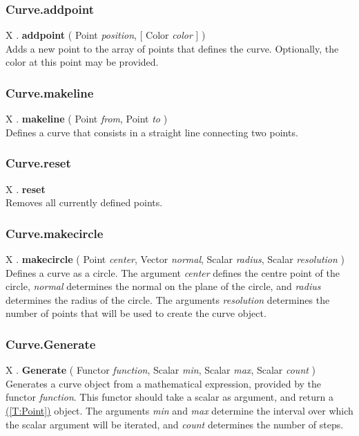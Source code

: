\documentclass[10pt]{book}
\newcommand{\linkitem}[1]{\hyperref[#1]{\nameref{#1} (\ref{#1})}}
\newcommand{\var}[1]{\textit{#1}}
\begin{document}
\subsubsection{Curve.addpoint \label{F:Curve:addpoint}}
X . \textbf{addpoint} ( Point \textit{position},  [ Color \textit{color} ] ) \\
Adds a new point to the array of points that defines the curve. Optionally, the color at this point may be provided.

\subsubsection{Curve.makeline \label{F:Curve:makeline}}
X . \textbf{makeline} ( Point \textit{from}, Point \textit{to} ) \\
Defines a curve that consists in a straight line connecting two points.

\subsubsection{Curve.reset \label{F:Curve:reset}}
X . \textbf{reset} \\
Removes all currently defined points.

\subsubsection{Curve.makecircle \label{F:Curve:makecircle}}
X . \textbf{makecircle} ( Point \textit{center}, Vector \textit{normal}, Scalar \textit{radius}, Scalar \textit{resolution} ) \\
Defines a curve as a circle. The argument \var{center} defines the centre point of the circle, \var{normal} determines the normal on the plane of the circle, and \var{radius} determines the radius of the circle. The arguments \var{resolution} determines the number of points that will be used to create the curve object.

\subsubsection{Curve.Generate \label{F:Curve:Generate}}
X . \textbf{Generate} ( Functor \textit{function}, Scalar \textit{min}, Scalar \textit{max}, Scalar \textit{count} ) \\
Generates a curve object from a mathematical expression, provided by the functor \var{function}. This functor should take a scalar as argument, and return a \linkitem{T:Point} object. The arguments \var{min} and \var{max} determine the interval over which the scalar argument will be iterated, and \var{count} determines the number of steps.
\end{document}
